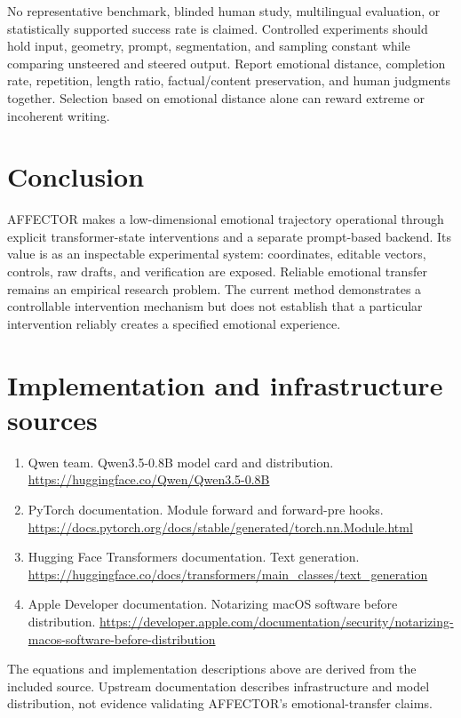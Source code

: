 \documentclass[manuscript,screen,nonacm]{acmart}
\begin{document}
No representative benchmark, blinded human study, multilingual
evaluation, or statistically supported success rate is claimed.
Controlled experiments should hold input, geometry, prompt,
segmentation, and sampling constant while comparing unsteered and
steered output. Report emotional distance, completion rate, repetition,
length ratio, factual/content preservation, and human judgments
together. Selection based on emotional distance alone can reward extreme
or incoherent writing.

\section{Conclusion}\label{conclusion}

AFFECTOR makes a low-dimensional emotional trajectory operational
through explicit transformer-state interventions and a separate
prompt-based backend. Its value is as an inspectable experimental
system: coordinates, editable vectors, controls, raw drafts, and
verification are exposed. Reliable emotional transfer remains an
empirical research problem. The current method demonstrates a
controllable intervention mechanism but does not establish that a
particular intervention reliably creates a specified emotional
experience.

\section{Implementation and infrastructure
sources}\label{implementation-and-infrastructure-sources}

\begin{enumerate}
\def\labelenumi{\arabic{enumi}.}
\item
  Qwen team. Qwen3.5-0.8B model card and distribution.
  \url{https://huggingface.co/Qwen/Qwen3.5-0.8B}
\item
  PyTorch documentation. Module forward and forward-pre hooks.
  \url{https://docs.pytorch.org/docs/stable/generated/torch.nn.Module.html}
\item
  Hugging Face Transformers documentation. Text generation.
  \url{https://huggingface.co/docs/transformers/main_classes/text_generation}
\item
  Apple Developer documentation. Notarizing macOS software before
  distribution.
  \url{https://developer.apple.com/documentation/security/notarizing-macos-software-before-distribution}
\end{enumerate}

The equations and implementation descriptions above are derived from the
included source. Upstream documentation describes infrastructure and
model distribution, not evidence validating AFFECTOR's
emotional-transfer claims.
\end{document}
